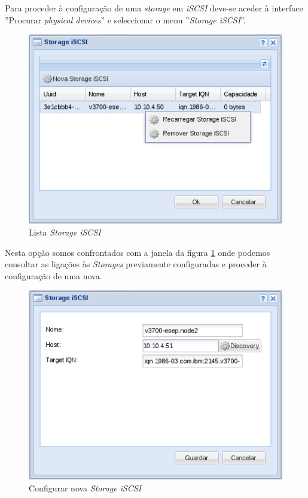 Para proceder à configuração de uma \emph{storage} em \emph{iSCSI} deve-se aceder à interface ''Procurar \emph{physical devices}'' e seleccionar o menu ''\emph{Storage iSCSI}''.

\begin{figure}[H]
        \begin{center}
        \includegraphics[scale=0.45]{screenshots/node_storage_iscsi_grid.png}
        \caption{Lista \emph{Storage iSCSI} }
        \label{fig:storage_iscsi_grid}
        \end{center}
\end{figure}

Nesta opção somos confrontados com a janela da figura \ref{fig:storage_iscsi_grid} onde podemos consultar as ligações às \emph{Storages} previamente configuradas e proceder à configuração de uma nova.

\begin{figure}[H]
        \begin{center}
        \includegraphics[scale=0.45]{screenshots/node_storage_iscsi_new.png}
        \caption{Configurar nova \emph{Storage iSCSI} }
        \label{fig:storage_iscsi_new}
        \end{center}
\end{figure}

